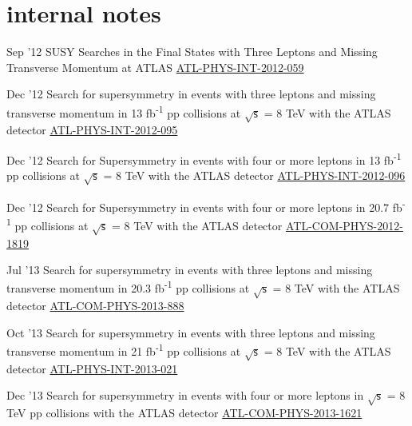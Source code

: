 \documentclass[]{cv} %
\begin{document}
\section{internal notes}
\begin{entrylist}

\entry
{Sep '12}
{{\normalfont SUSY Searches in the Final States with Three Leptons and Missing Transverse Momentum at ATLAS}}
{\href{https://cds.cern.ch/record/1482141}{ATL-PHYS-INT-2012-059}}
{\vspace*{-9pt}}

\entry
{Dec '12}
{{\normalfont Search for supersymmetry in events with three leptons and missing transverse momentum in 13 fb\textsuperscript{-1} pp collisions
at $\sqrt{\mathsf{s}}$ = 8 TeV with the ATLAS detector}}
{\href{https://cds.cern.ch/record/1498390}{ATL-PHYS-INT-2012-095}}
{\vspace*{-9pt}}

\entry
{Dec '12}
{{\normalfont Search for Supersymmetry in events with four or more leptons in 13 fb\textsuperscript{-1} pp collisions at $\sqrt{\mathsf{s}}$ =
8 TeV with the ATLAS detector}}
{\href{https://cds.cern.ch/record/1498627}{ATL-PHYS-INT-2012-096}}
{\vspace*{-9pt}}

\entry
{Dec '12}
{{\normalfont Search for Supersymmetry in events with four or more leptons in 20.7 fb\textsuperscript{-1} pp collisions at $\sqrt{\mathsf{s}}$
= 8 TeV with the ATLAS detector}}
{\href{https://cds.cern.ch/record/1501709}{ATL-COM-PHYS-2012-1819}}
{\vspace*{-9pt}}

\entry
{Jul '13}
{{\normalfont Search for supersymmetry in events with three leptons and missing transverse momentum in 20.3 fb\textsuperscript{-1} pp
collisions at $\sqrt{\mathsf{s}}$ = 8 TeV with the ATLAS detector}}
{\href{https://cds.cern.ch/record/1558985}{ATL-COM-PHYS-2013-888}}
{\vspace*{-9pt}}

\entry
{Oct '13}
{{\normalfont Search for supersymmetry in events with three leptons and missing transverse momentum in 21 fb\textsuperscript{-1} pp collisions
at $\sqrt{\mathsf{s}}$ = 8 TeV with the ATLAS detector}}
{\href{https://cds.cern.ch/record/1610185}{ATL-PHYS-INT-2013-021}}
{\vspace*{-9pt}}

\entry
{Dec '13}
{{\normalfont Search for supersymmetry in events with four or more leptons in $\sqrt{\mathsf{s}}$ = 8 TeV pp collisions with the ATLAS
detector}}
{\href{https://cds.cern.ch/record/1635455}{ATL-COM-PHYS-2013-1621}}
{\vspace*{-9pt}}

\end{entrylist}
\fi
\end{document}
